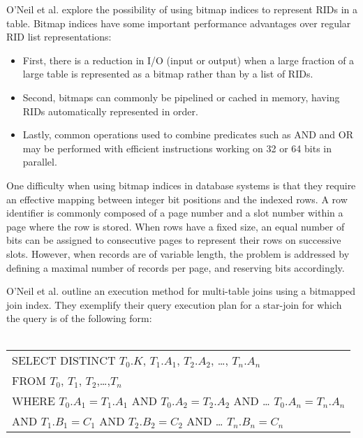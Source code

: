 \documentclass[12pt]{article}
\begin{document}
O’Neil et al. explore the possibility of using bitmap indices to represent RIDs in a table. Bitmap indices have some important performance advantages over regular RID list representations:

\begin{itemize}

	\item First, there is a reduction in I/O (input or output) when a large fraction of a large table is represented as a bitmap rather than by a list of RIDs. 

	\item Second, bitmaps can commonly be pipelined or cached in memory, having RIDs automatically represented in order. 

	\item Lastly, common operations used to combine predicates such as AND and OR may be performed with efficient instructions working on 32 or 64 bits in parallel.

\end{itemize}

One difficulty when using bitmap indices in database systems is that they require an effective mapping between integer bit
positions and the indexed rows. A row identifier is commonly composed of a page number and a slot number within a page where
the row is stored. When rows have a fixed size, an equal number of bits can be assigned to consecutive pages to represent
their rows on successive slots. However, when records are of variable length, the problem is addressed by defining a maximal
number of records per page, and reserving bits accordingly.

O’Neil et al. outline an execution method for multi-table joins using a bitmapped join index. They exemplify their query
execution plan for a star-join for which the query is of the following form:
\\\\
\begin{tabular}{l}
    SELECT DISTINCT $T_{0}.K$, $T_{1}.A_{1}$, $T_{2}.A_{2}$, …, $T_{n}.A_{n}$\\
    FROM $T_{0}$, $T_{1}$, $T_{2}$,…,$T_{n}$\\
    WHERE $T_{0}.A_{1} = T_{1}.A_{1}$ AND $T_{0}.A_{2} = T_{2}.A_{2}$ AND … $T_{0}.A_{n} = T_{n}.A_{n}$\\
    AND $T_{1}.B_{1} = C_{1}$ AND $T_{2}.B_{2} = C_{2}$ AND … $T_{n}.B_{n} = C_{n}$
\end{tabular}
\\
\end{document}
